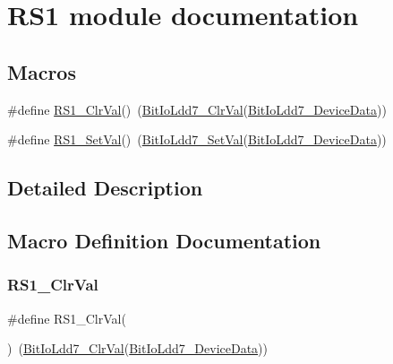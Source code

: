 \hypertarget{group___r_s1__module}{}\section{R\+S1 module documentation}
\label{group___r_s1__module}
\subsection*{Macros}
\begin{DoxyCompactItemize}
\item 
\#define \hyperlink{group___r_s1__module_ga80a16b6defc90b3dcdd0487896e7f501}{R\+S1\+\_\+\+Clr\+Val}()~(\hyperlink{group___bit_io_ldd7__module_ga6eafafb0a2c30b4347462e6ff00d6f45}{Bit\+Io\+Ldd7\+\_\+\+Clr\+Val}(\hyperlink{group___bit_io_ldd7__module_ga28a1c938c911f765d2dc333694f9505f}{Bit\+Io\+Ldd7\+\_\+\+Device\+Data}))
\item 
\#define \hyperlink{group___r_s1__module_ga3bde9e90d3782ef979a2a3dad1065923}{R\+S1\+\_\+\+Set\+Val}()~(\hyperlink{group___bit_io_ldd7__module_gaae11392cdaf0061ec255e1de58e509f5}{Bit\+Io\+Ldd7\+\_\+\+Set\+Val}(\hyperlink{group___bit_io_ldd7__module_ga28a1c938c911f765d2dc333694f9505f}{Bit\+Io\+Ldd7\+\_\+\+Device\+Data}))
\end{DoxyCompactItemize}


\subsection{Detailed Description}


\subsection{Macro Definition Documentation}
\mbox{\label{group___r_s1__module_ga80a16b6defc90b3dcdd0487896e7f501}} 
\subsubsection{\texorpdfstring{R\+S1\+\_\+\+Clr\+Val}{RS1\_ClrVal}}
{\footnotesize\ttfamily \#define R\+S1\+\_\+\+Clr\+Val(\begin{DoxyParamCaption}{ }\end{DoxyParamCaption})~(\hyperlink{group___bit_io_ldd7__module_ga6eafafb0a2c30b4347462e6ff00d6f45}{Bit\+Io\+Ldd7\+\_\+\+Clr\+Val}(\hyperlink{group___bit_io_ldd7__module_ga28a1c938c911f765d2dc333694f9505f}{Bit\+Io\+Ldd7\+\_\+\+Device\+Data}))}

